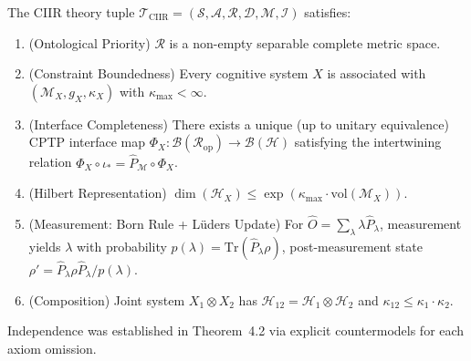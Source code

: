 \begin{axiom}
\label{ax:c9:full}
The CIIR theory tuple $\mathcal{T}_{\mathrm{CIIR}} = (\mathcal{S}, \mathcal{A},
\mathcal{R}, \mathcal{D}, \mathcal{M}, \mathcal{I})$ satisfies:
\begin{enumerate}
\item[\textbf{Ax1}] (Ontological Priority) $\mathcal{R}$ is a non-empty
  separable complete metric space.
\item[\textbf{Ax2}] (Constraint Boundedness)  Every cognitive system $X$
  is associated with $(\mathcal{M}_X, g_X, \kappa_X)$ with
  $\kappa_{\max} < \infty$.
\item[\textbf{Ax3}] (Interface Completeness)  There exists a unique
  (up to unitary equivalence) CPTP interface map
  $\Phi_X : \mathcal{B}(\mathcal{R}_{\mathrm{op}}) \to
  \mathcal{B}(\mathcal{H})$ satisfying the intertwining relation
  $\Phi_X \circ \iota_* = \hat{P}_{\mathcal{M}} \circ \Phi_X$.
\item[\textbf{Ax4}] (Hilbert Representation)  $\dim(\mathcal{H}_X) \leq
  \exp(\kappa_{\max} \cdot \mathrm{vol}(\mathcal{M}_X))$.
\item[\textbf{Ax5}] (Measurement: Born Rule + L\"uders Update)  For
  $\hat{O} = \sum_\lambda \lambda \hat{P}_\lambda$, measurement yields
  $\lambda$ with probability $p(\lambda) = \mathrm{Tr}(\hat{P}_\lambda \rho)$,
  post-measurement state $\rho' = \hat{P}_\lambda \rho \hat{P}_\lambda /
  p(\lambda)$.
\item[\textbf{Ax6}] (Composition)  Joint system $X_1 \otimes X_2$ has
  $\mathcal{H}_{12} = \mathcal{H}_1 \otimes \mathcal{H}_2$ and
  $\kappa_{12} \leq \kappa_1 \cdot \kappa_2$.
\end{enumerate}
\end{axiom}

\begin{remark}
Independence was established in Theorem~4.2 via explicit countermodels
for each axiom omission.
\end{remark}

